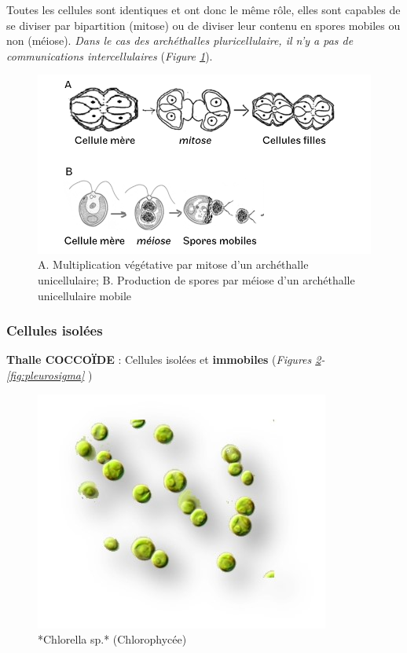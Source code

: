 \documentclass[
]{book}
\begin{document}
Toutes les cellules sont identiques et ont donc le même rôle, elles sont capables de se diviser par bipartition (mitose) ou de diviser leur contenu en spores mobiles ou non (méiose). \emph{Dans le cas des archéthalles pluricellulaire, il n'y a pas de communications intercellulaires} (\emph{Figure \ref{fig:archetallediv}}).

\begin{figure}[H]

{\centering \includegraphics[width=0.7\linewidth]{./images/archetalle_div} 

}

\caption{A. Multiplication végétative par mitose d'un archéthalle unicellulaire; B. Production de spores par méiose d'un archéthalle unicellulaire mobile}\label{fig:archetallediv}
\end{figure}

\hypertarget{cellules-isoluxe9es}{%
\subsubsection{Cellules isolées}\label{cellules-isoluxe9es}}

\textbf{Thalle COCCOÏDE} : Cellules isolées et \textbf{immobiles} (\emph{Figures \ref{fig:chlorella}-\ref{fig:pleurosigma} })

\begin{figure}[H]

{\centering \includegraphics[width=0.7\linewidth]{./images/chlorellasp} 

}

\caption{*Chlorella sp.* (Chlorophycée)}\label{fig:chlorella}
\end{figure}
\end{document}
